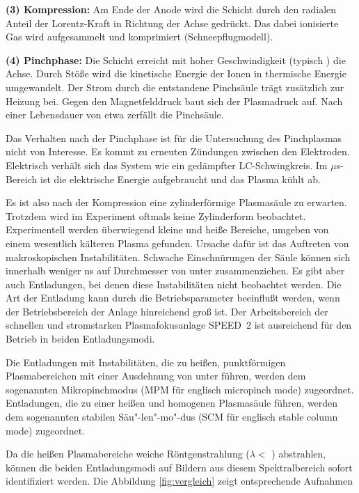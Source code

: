 {\bf (3) Kompression:} Am Ende der Anode wird die Schicht durch den
radialen Anteil der Lorentz-Kraft in Richtung der Achse gedrückt. Das
dabei ionisierte Gas wird aufgesammelt und komprimiert
(Schneepflugmodell).
\par
{\bf (4) Pinchphase:} Die Schicht erreicht mit hoher Geschwindigkeit
(typisch ) die Achse. Durch Stöße wird die kinetische
Energie der Ionen in thermische Energie umgewandelt. Der Strom durch
die entstandene Pinchsäule trägt zusätzlich zur Heizung bei. Gegen den
Magnetfelddruck baut sich der Plasmadruck auf. Nach einer Lebensdauer
von etwa  zerfällt die Pinchsäule.
\par
Das Verhalten nach der Pinchphase ist für die Untersuchung des
Pinchplasmas nicht von Interesse. Es kommt zu erneuten Zündungen
zwischen den Elektroden. Elektrisch verhält sich das System wie ein
gedämpfter LC-Schwingkreis. Im $\mu$s-Bereich ist die elektrische
Energie aufgebraucht und das Plasma kühlt ab.
\par
Es ist also nach der Kompression eine zylinderförmige Plasmasäule zu
erwarten. Trotzdem wird im Experiment oftmals keine Zylinderform
beobachtet. Experimentell werden überwiegend kleine und heiße Bereiche,
umgeben von einem wesentlich kälteren Plasma gefunden. Ursache dafür
ist das Auftreten von makroskopischen Instabilitäten. Schwache
Einschnürungen der Säule können sich innerhalb weniger ns auf
Durchmesser von unter  zusammenziehen. Es gibt aber auch
Entladungen, bei denen diese Instabilitäten nicht beobachtet werden.
Die Art der Entladung kann durch die Betriebsparameter beeinflußt
werden, wenn der Betriebsbereich der Anlage hinreichend groß ist.
%
%
Der Arbeitsbereich der schnellen und stromstarken Plasmafokusanlage SPEED~2 ist
ausreichend für den Betrieb in beiden Entladungsmodi.
\par
Die Entladungen mit Instabilitäten, die zu heißen, punktförmigen
Plasmabereichen mit einer Ausdehnung von unter 
führen, werden dem sogenannten Mikropinchmodus (MPM für englisch
micropinch mode) zugeordnet. Entladungen, die zu einer heißen und
homogenen Plasmasäule führen, werden dem sogenannten stabilen
Säu"-len"-mo"-dus (SCM für englisch stable column mode)
zugeordnet.
\par
Da die heißen Plasmabereiche weiche Röntgenstrahlung ($\lambda < $
) abstrahlen, können die beiden Entladungsmodi auf
Bildern aus diesem Spektralbereich sofort identifiziert werden.
Die Abbildung \vref{fig:vergleich} zeigt entsprechende Aufnahmen
